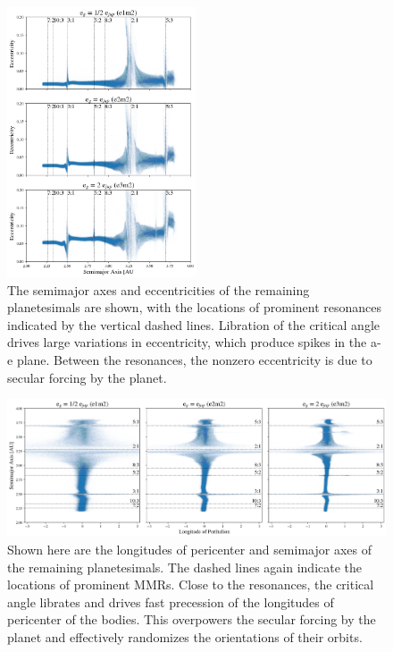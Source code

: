 \documentclass[twocolumn]{aastex63}
\begin{document}
\begin{figure}
\begin{center}
    \includegraphics[width=0.5\textwidth]{figures/ae.png}
    \caption{The semimajor axes and eccentricities of the remaining planetesimals are shown, with the locations of prominent resonances indicated 
    by the vertical dashed lines. Libration of the critical angle drives large variations in eccentricity, which produce spikes in the a-e plane. Between 
    the resonances, the nonzero eccentricity is due to secular forcing by the planet.\label{fig:ae}}
\end{center}
\end{figure}

\begin{figure}
\begin{center}
    \includegraphics[width=\textwidth]{figures/long_ph.png}
    \caption{Shown here are the longitudes of pericenter and semimajor axes of the remaining planetesimals. The dashed lines again indicate the 
    locations of prominent MMRs. Close to the resonances, the critical angle librates and drives fast precession of the longitudes of pericenter of the 
    bodies. This overpowers the secular forcing by the planet and effectively randomizes the orientations of their orbits.\label{fig:long_ph}}
\end{center}
\end{figure}
\end{document}
